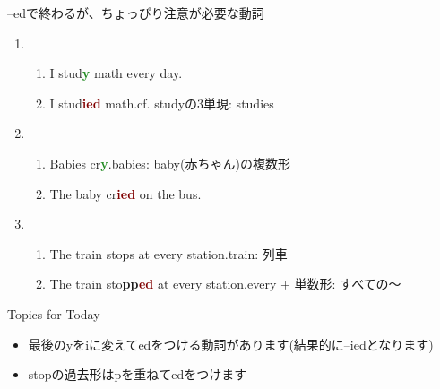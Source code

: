 \documentclass[aspectratio=169,xcolor={dvipsnames,table}]{beamer}
\newcommand{\myaudio}[1]{\href{#1}{\faVolumeUp}}
\begin{document}
\begin{frame}[plain]{--edで終わるが、ちょっぴり注意が必要な動詞}
 \pause
\begin{enumerate}
 \item \begin{enumerate}
	\item I stud\textcolor{ForestGreen}{\bfseries y} math every day.\pause
	\item I stud\textcolor{Maroon}{\bfseries ied} math.\hfill{}{{\scriptsize cf. studyの3単現: studies}}\pause
       \end{enumerate}
 \item \begin{enumerate}
	\item Babies cr\textcolor{ForestGreen}{\bfseries y}.\hfill{}{{\scriptsize  babies: baby(赤ちゃん)の複数形}}\pause
	\item The baby cr\textcolor{Maroon}{\bfseries ied} on the bus.\pause
       \end{enumerate}
 \item \begin{enumerate}
	\item The train stops at every station.\hfill{}{{\scriptsize train: 列車}}\pause
	\item The train sto\textcolor{NavyBlue}{\bfseries pp}\textcolor{Maroon}{\bfseries ed} at every station.\hfill{}{{\scriptsize every $+$ 単数形: すべての～ }}\pause
       \end{enumerate}
\end{enumerate}

\begin{exampleblock}{Topics for Today}\small
\begin{itemize}[square]
 \item 最後のyをiに変えてedをつける動詞があります(結果的に--iedとなります)\pause
 \item stopの過去形はpを重ねてedをつけます
\end{itemize}
\end{exampleblock}
\hfill\myaudio{./audio/025_past_do_08.mp3}

\end{frame}
\end{document}

